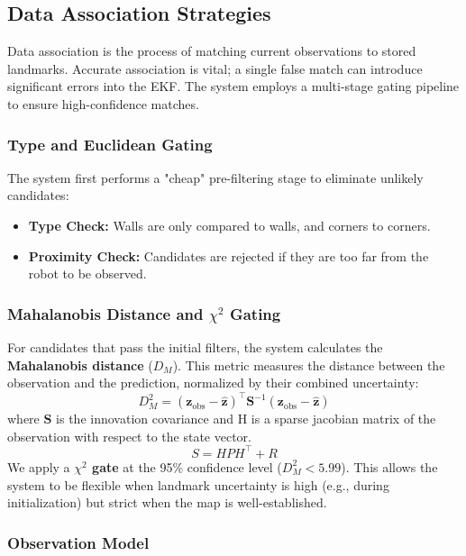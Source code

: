 \documentclass[11pt]{article}
\begin{document}
\subsection{Data Association Strategies}

Data association is the process of matching current observations to stored landmarks. Accurate association is vital; a single false match can introduce significant errors into the EKF. The system employs a multi-stage gating pipeline to ensure high-confidence matches.

\subsubsection{Type and Euclidean Gating}
The system first performs a "cheap" pre-filtering stage to eliminate unlikely candidates:
\begin{itemize}
	\item \textbf{Type Check:} Walls are only compared to walls, and corners to corners.
	\item \textbf{Proximity Check:} Candidates are rejected if they are too far from the robot to be observed.
\end{itemize}

\subsubsection{Mahalanobis Distance and $\chi^2$ Gating}
For candidates that pass the initial filters, the system calculates the \textbf{Mahalanobis distance} ($D_M$). This metric measures the distance between the observation and the prediction, normalized by their combined uncertainty:
\begin{equation}
	D_M^2 = (\mathbf{z}_{\text{obs}} - \hat{\mathbf{z}})^\top \mathbf{S}^{-1} (\mathbf{z}_{\text{obs}} - \hat{\mathbf{z}})
\end{equation}
where $\mathbf{S}$ is the innovation covariance and H is a sparse jacobian matrix of the observation with respect to the state vector.
\begin{equation}
	S = H P H^\top + R
\end{equation}
We apply a \textbf{$\chi^2$ gate} at the 95\% confidence level ($D_M^2 < 5.99$). This allows the system to be flexible when landmark uncertainty is high (e.g., during initialization) but strict when the map is well-established.

\subsubsection{Observation Model}
\end{document}
